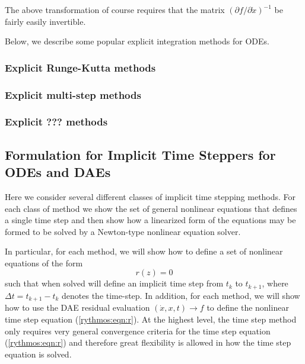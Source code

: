 \documentclass[pdf,ps2pdf,11pt]{SANDreport}
\begin{document}
The above transformation of course requires that the matrix $({}\partial f /
{}\partial {}\dot{x})^{-1}$ be fairly easily invertible.

Below, we describe some popular explicit integration methods for ODEs.

\subsubsection{Explicit Runge-Kutta methods}

\subsubsection{Explicit multi-step methods}

\subsubsection{Explicit ??? methods}

\subsection{Formulation for Implicit Time Steppers for ODEs and DAEs}

Here we consider several different classes of implicit time stepping methods.
For each class of method we show the set of general nonlinear equations that
defines a single time step and then show how a linearized form of the
equations may be formed to be solved by a Newton-type nonlinear equation
solver.

In particular, for each method, we will show how to define a set of nonlinear
equations of the form
%
\begin{equation}
r(z) = 0
\label{rythmos:eqn:r}
\end{equation}
%
such that when solved will define an implicit time step from $t_k$ to
$t_{k+1}$, where $\Delta t = t_{k+1} - t_k$ denotes the time-step.  In
addition, for each method, we will show how to use the DAE residual evaluation
$(\dot{x},x,t) {}\rightarrow f$ to define the nonlinear time step equation
(\ref{rythmos:eqn:r}).  At the highest level, the time step method only
requires very general convergence criteria for the time step equation
(\ref{rythmos:eqn:r}) and therefore great flexibility is allowed in how the
time step equation is solved.
\end{document}
